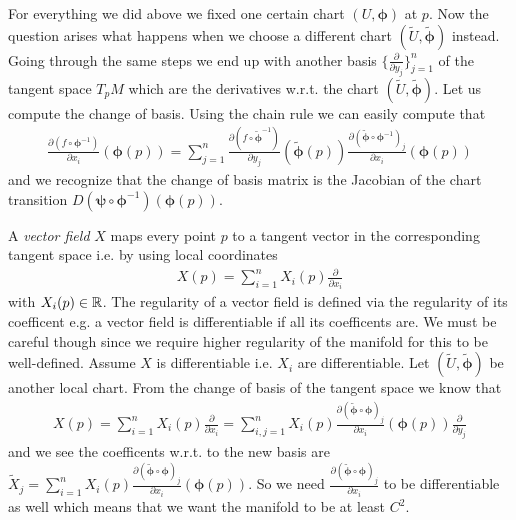 \documentclass[../master_thesis.tex]{subfiles}
\begin{document}
For everything we did above we fixed one certain chart $(U,\boldsymbol{\phi})$ at $p$.
Now the question arises what happens when we choose a different chart 
$(\tilde{U}, \tilde{\boldsymbol{\phi}})$ instead.
Going through the same steps we end up with another basis 
$\{ \frac{\partial}{\partial y_j} \}_{j=1}^n$ of the tangent space $T_p M$
which are the derivatives w.r.t. the chart 
$(\tilde{U}, \tilde{\boldsymbol{\phi}})$. 
Let us compute the change of basis.
Using the chain rule 
we can easily compute that 
\begin{align*}
    \frac{\partial (f \circ \boldsymbol{\phi}^{-1})}{\partial x_i} (\boldsymbol{\phi}(p))
    =\sum_{j=1}^n \frac{\partial (f \circ \tilde{\boldsymbol{\phi}}^{-1})}{\partial y_j} (\tilde{\boldsymbol{\phi}}(p))
        \frac{\partial (\tilde{\boldsymbol{\phi}} \circ \boldsymbol{\phi}^{-1})_j}{\partial x_i}(\boldsymbol{\phi}(p)) 
\end{align*}
and we recognize that the change of basis matrix is the Jacobian of 
the chart transition $D(\bm{\psi} \circ \boldsymbol{\phi}^{-1})(\boldsymbol{\phi}(p))$.

A \textit{vector field} $X$ maps every point $p$ to a tangent vector 
in the corresponding tangent space i.e. by using local coordinates
\begin{align*}
    X(p) = \sum_{i=1}^n X_i(p) \frac{\partial}{\partial x_i}
\end{align*}
with $X_i(p) \in \mathbb{R}$. The regularity of a vector field is defined via the
regularity of its coefficent e.g. a vector field is differentiable if 
all its coefficents are. We must be careful though since we require higher 
regularity of the manifold for this to be well-defined. 
Assume $X$ is differentiable i.e. $X_i$ are differentiable. 
Let $(\tilde{U}, \tilde{\bm{\phi}})$ 
be another local chart.
From the 
change of basis of the tangent space we know that 
\begin{align*}
    X(p) = \sum_{i=1}^n X_i(p) \frac{\partial}{\partial x_i}
    = \sum_{i,j=1}^n X_i(p) \frac{\partial (\tilde{\boldsymbol{\phi}} 
        \circ \boldsymbol{\phi})_j}{\partial x_i}(\boldsymbol{\phi}(p))
        \frac{\partial}{\partial y_j}
\end{align*}
and we see the coefficents w.r.t. to the new basis are 
$\tilde{X}_j = \sum_{i=1}^n X_i(p) \frac{\partial (\tilde{\boldsymbol{\phi}} 
\circ \boldsymbol{\phi})_j}{\partial x_i}(\boldsymbol{\phi}(p))$.
So we need $\frac{\partial (\tilde{\boldsymbol{\phi}} \circ \boldsymbol{\phi})_j}{\partial x_i}$ to be 
differentiable as well which means that we want the manifold to be at least $C^2$.
\end{document}
